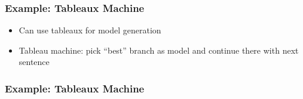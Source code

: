 \begin{frame}[fragile]
    \frametitle{Example: Tableaux Machine~\cite{KohKol:ramgpm03}}
    \begin{itemize}
        \item Can use tableaux for model generation
        \item Tableau machine: pick ``best'' branch as model and continue there with next sentence
    \end{itemize}

    \vspace{1.5em}
    \begin{minipage}[t][4.5cm]{\textwidth}
        
    \end{minipage}
\end{frame}

\begin{frame}
    \frametitle{Example: Tableaux Machine}
    \makebox[\linewidth]{}
\end{frame}

